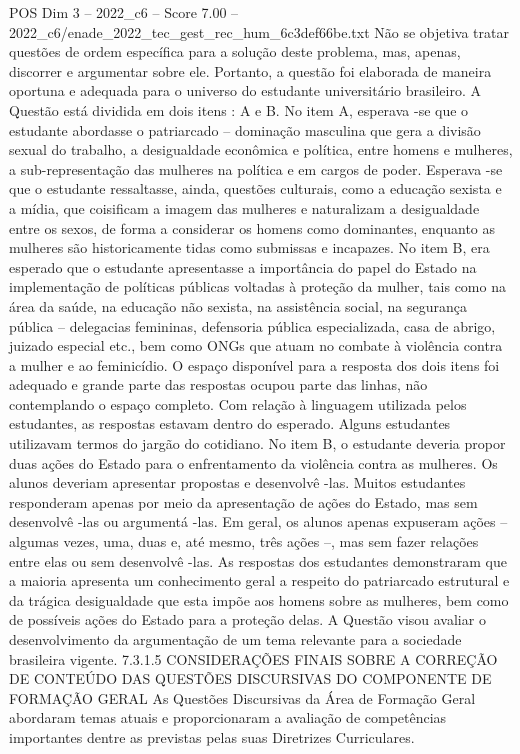 \begin{textsample}{POS Dim 3 – 2022\_c6 – Score 7.00 – 2022\_c6/enade\_2022\_tec\_gest\_rec\_hum\_6c3def66be.txt}
Não se objetiva tratar questões de ordem específica para a solução deste problema, mas, apenas, discorrer e argumentar sobre ele.
Portanto, a questão foi elaborada de maneira oportuna e adequada para o universo do estudante universitário brasileiro.
A Questão está dividida em dois itens : A e B.
No item A, esperava -se que o estudante abordasse o patriarcado – dominação masculina que gera a divisão sexual do trabalho, a desigualdade econômica e política, entre homens e mulheres, a sub-representação das mulheres na política e em cargos de poder.
Esperava -se que o estudante ressaltasse, ainda, questões culturais, como a educação sexista e a mídia, que coisificam a imagem das mulheres e naturalizam a desigualdade entre os sexos, de forma a considerar os homens como dominantes, enquanto as mulheres são historicamente tidas como submissas e incapazes.
No item B, era esperado que o estudante apresentasse a importância do papel do Estado na implementação de políticas públicas voltadas à proteção da mulher, tais como na área da saúde, na educação não sexista, na assistência social, na segurança pública – delegacias femininas, defensoria pública especializada, casa de abrigo, juizado especial etc., bem como ONGs que atuam no combate à violência contra a mulher e ao feminicídio.
O espaço disponível para a resposta dos dois itens foi adequado e grande parte das respostas ocupou parte das linhas, não contemplando o espaço completo.
Com relação à linguagem utilizada pelos estudantes, as respostas estavam dentro do esperado.
Alguns estudantes utilizavam termos do jargão do cotidiano.
No item B, o estudante deveria propor duas ações do Estado para o enfrentamento da violência contra as mulheres.
Os alunos deveriam apresentar propostas e desenvolvê -las.
Muitos estudantes responderam apenas por meio da apresentação de ações do Estado, mas sem desenvolvê -las ou argumentá -las.
Em geral, os alunos apenas expuseram ações – algumas vezes, uma, duas e, até mesmo, três ações –, mas sem fazer relações entre elas ou sem desenvolvê -las.
As respostas dos estudantes demonstraram que a maioria apresenta um conhecimento geral a respeito do patriarcado estrutural e da trágica desigualdade que esta impõe aos homens sobre as mulheres, bem como de possíveis ações do Estado para a proteção delas.
A Questão visou avaliar o desenvolvimento da argumentação de um tema relevante para a sociedade brasileira vigente. 7.3.1.5 CONSIDERAÇÕES FINAIS SOBRE A CORREÇÃO DE CONTEÚDO DAS QUESTÕES DISCURSIVAS DO COMPONENTE DE FORMAÇÃO GERAL As Questões Discursivas da Área de Formação Geral abordaram temas atuais e proporcionaram a avaliação de competências importantes dentre as previstas pelas suas Diretrizes Curriculares.

\end{textsample}
